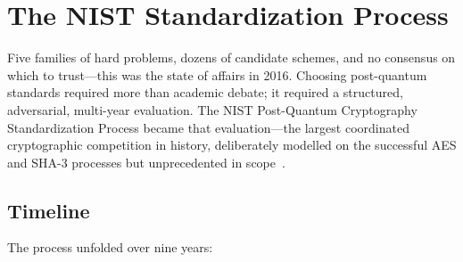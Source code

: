 \section{The NIST Standardization Process}
\label{sec:nist-process}

Five families of hard problems, dozens of candidate schemes, and no consensus on which to trust---this was the state of affairs in 2016.  Choosing post-quantum standards required more than academic debate; it required a structured, adversarial, multi-year evaluation.  The NIST Post-Quantum Cryptography Standardization Process became that evaluation---the largest coordinated cryptographic competition in history, deliberately modelled on the successful AES and SHA-3 processes but unprecedented in scope~\cite{BernsteinLange2017}.

\subsection{Timeline}
\label{subsec:nist-timeline}

The process unfolded over nine years:

